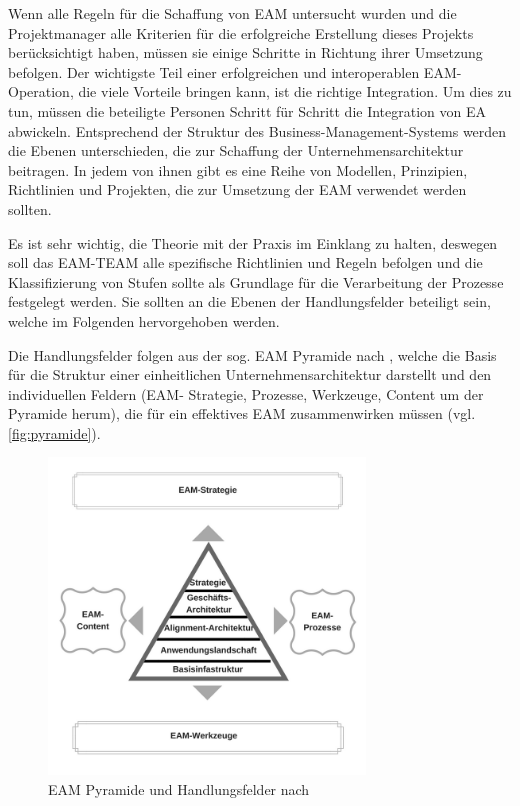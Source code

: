 \documentclass[
	doc,
	a4paper,
	helv
	]{apa6}
\begin{document}
Wenn alle Regeln für die Schaffung von EAM untersucht wurden und die Projektmanager alle Kriterien für die erfolgreiche Erstellung dieses Projekts berücksichtigt haben, müssen sie einige Schritte in Richtung ihrer Umsetzung befolgen. Der wichtigste Teil einer erfolgreichen und interoperablen EAM-Operation, die viele Vorteile bringen kann, ist die richtige Integration. Um dies zu tun, müssen die beteiligte Personen Schritt für Schritt die Integration von EA abwickeln. Entsprechend der Struktur des Business-Management-Systems werden die Ebenen unterschieden, die zur Schaffung der Unternehmensarchitektur beitragen. In jedem von ihnen gibt es eine Reihe von Modellen, Prinzipien, Richtlinien und Projekten, die zur Umsetzung der EAM verwendet werden sollten.

Es ist sehr wichtig, die Theorie mit der Praxis im Einklang zu halten, deswegen soll das EAM-TEAM alle spezifische Richtlinien und Regeln befolgen und die Klassifizierung von Stufen sollte als Grundlage für die Verarbeitung der Prozesse festgelegt werden. Sie sollten an die Ebenen der Handlungsfelder beteiligt sein, welche im Folgenden hervorgehoben werden.

Die Handlungsfelder folgen aus der sog. EAM Pyramide nach \textcite{Keuntje2010}, welche die Basis für die Struktur einer einheitlichen Unternehmensarchitektur darstellt und den individuellen Feldern (EAM- Strategie, Prozesse, Werkzeuge, Content um der Pyramide herum), die für ein effektives EAM zusammenwirken müssen (vgl. \autoref{fig:pyramide}).

\begin{figure}[!htbp]
\begin{center}
\includegraphics[width=0.75\textwidth]{Abbildungen/Pyramide.png}
\caption{EAM Pyramide und Handlungsfelder nach \textcite{Keuntje2010}}
\label{fig:pyramide}
\end{center}
\end{figure}
\end{document}

